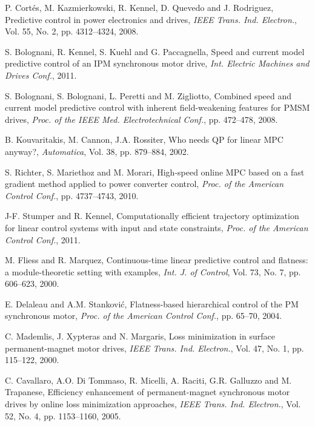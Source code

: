 \documentclass[a4paper,11pt,fleqn]{article}
\begin{document}
\begin{thebibliography}{99}  \setlength{\itemsep}{-1mm}

\small

P. Cort\'es, M. Kazmierkowski, R. Kennel, D. Quevedo and J. Rodriguez, Predictive control in power electronics and drives, {\it IEEE Trans. Ind. Electron.}, Vol. 55, No. 2, pp. 4312--4324, 2008.

S. Bolognani, R. Kennel, S. Kuehl and G. Paccagnella, Speed and current model predictive control of an IPM synchronous motor drive, {\it Int. Electric Machines and Drives Conf.}, 2011. 

S. Bolognani, S. Bolognani, L. Peretti and M. Zigliotto, Combined speed and current model predictive control with inherent field-weakening features for PMSM drives, {\it Proc. of the IEEE Med. Electrotechnical Conf.}, pp. 472--478, 2008.

B. Kouvaritakis, M. Cannon, J.A. Rossiter, Who needs QP for linear MPC anyway?, {\it Automatica}, Vol. 38, pp. 879--884, 2002.

S. Richter, S. Mariethoz and M. Morari, High-speed online MPC based on a fast gradient method applied to power converter control, {\it Proc. of the American Control Conf.}, pp. 4737--4743, 2010.

J-F. Stumper and R. Kennel, Computationally efficient trajectory optimization for linear control systems with input and state constraints, {\it Proc. of the American Control Conf.}, 2011.


M. Fliess and R. Marquez, Continuous-time linear predictive control and flatness: a module-theoretic setting with examples, {\it Int. J. of Control}, Vol. 73, No. 7, pp. 606--623, 2000.

E. Delaleau and A.M. Stankovi\'c, Flatness-based hierarchical control of the PM synchronous motor, {\it Proc. of the American Control Conf.}, pp. 65--70, 2004.


C. Mademlis, J. Xypteras and N. Margaris, Loss minimization in surface permanent-magnet motor drives, {\it IEEE Trans. Ind. Electron.}, Vol. 47, No. 1, pp. 115--122, 2000.

C. Cavallaro, A.O. Di Tommaso, R. Micelli, A. Raciti, G.R. Galluzzo and M. Trapanese, Efficiency enhancement of permanent-magnet synchronous motor drives by online loss minimization approaches, {\it IEEE Trans. Ind. Electron.}, Vol. 52, No. 4, pp. 1153--1160, 2005.


\end{thebibliography}
\end{document}
